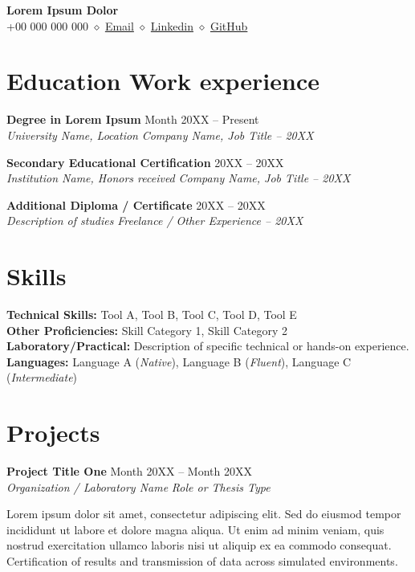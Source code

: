 \documentclass[11pt,a4paper]{article}
\newcommand{\entry}[4]{
  \noindent \textbf{#1} \hfill #2 \vspace{-3pt}\\
  \textit{#3} \hfill \textit{#4} \par
  \vspace{4pt}
}
\newcommand{\entryy}[4]{
  \noindent \textbf{#1} \hfill #2 \vspace{-1pt}\\
  \textit{#3} \hfill \textit{#4} \par
  \vspace{4pt}
}
\begin{document}
\begin{center}
    {\Huge \textbf{Lorem Ipsum Dolor}} \\
    \vspace{4pt}
    +00 000 000 000 $\diamond$ \href{mailto:lorem@ipsum.com}{Email} $\diamond$ \href{https://linkedin.com/in/loremipsum}{Linkedin} $\diamond$ \href{https://github.com/loremipsum}{GitHub}
\end{center}


\section{Education \hfill Work experience}
\entry{Degree in Lorem Ipsum}{Month 20XX -- Present}{University Name, Location}{Company Name, Job Title -- 20XX}

\entry{Secondary Educational Certification}{20XX -- 20XX}{Institution Name, Honors received}{Company Name, Job Title -- 20XX}

\entry{Additional Diploma / Certificate}{20XX -- 20XX}{Description of studies}{Freelance / Other Experience -- 20XX}


\section{Skills}
\textbf{Technical Skills:} Tool A, Tool B, Tool C, Tool D, Tool E\\
\textbf{Other Proficiencies:} Skill Category 1, Skill Category 2\\
\textbf{Laboratory/Practical:} Description of specific technical or hands-on experience.\\
\textbf{Languages:} Language A (\textit{Native}), Language B (\textit{Fluent}), Language C (\textit{Intermediate})


\section{Projects}
\entryy{Project Title One}{Month 20XX -- Month 20XX}{Organization / Laboratory Name}{Role or Thesis Type}
\vspace{-5pt} {\small Lorem ipsum dolor sit amet, consectetur adipiscing elit. Sed do eiusmod tempor incididunt ut labore et dolore magna aliqua. Ut enim ad minim veniam, quis nostrud exercitation ullamco laboris nisi ut aliquip ex ea commodo consequat. Certification of results and transmission of data across simulated environments.}
\end{document}
